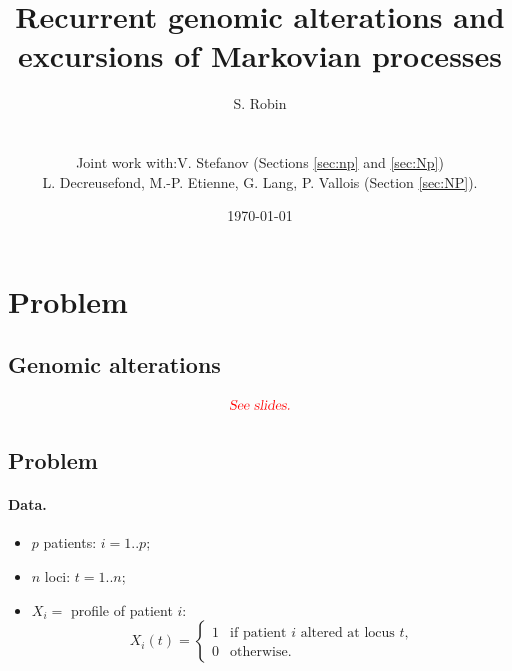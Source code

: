 \documentclass[a4paper,12pt]{article}
\begin{document}

\title{Recurrent genomic alterations and excursions of Markovian processes}
\author{S. Robin \\
  ~\\
  \begin{tabular}{lp{}}
   Joint work with:    & V. Stefanov (Sections \ref{sec:np} and \ref{sec:Np}) \\
   & L. Decreusefond, M.-P. Etienne, G. Lang, P. Vallois (Section \ref{sec:NP}).
  \end{tabular}
} 
\date{\today}
\maketitle

\tableofcontents

\newpage
\section{Problem}

\subsection{Genomic alterations} 

$$
\text{\textcolor{red}{\sl See slides.}}
$$

\subsection{Problem}
\paragraph{Data.} 
\begin{itemize}
  \item $p$ patients: $i = 1..p$;
  \item $n$ loci: $t = 1..n$;
  \item $X_i =$ profile of patient $i$:
  $$
  X_i(t) = \left\{\begin{array}{ll}
  1 & \text{if patient $i$ altered at locus $t$,} \\
  0 & \text{otherwise.}
  \end{array}\right.
  $$
\end{itemize}
\end{document}
